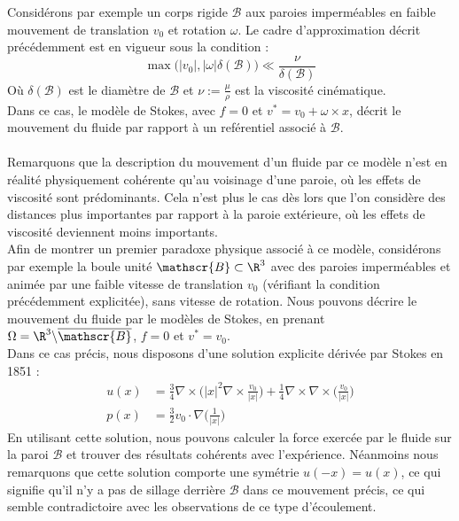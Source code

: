 Considérons par exemple un corps rigide $\mathscr{B}$ aux paroies imperméables en faible mouvement de translation $v_0$ et rotation $\omega$.
Le cadre d'approximation décrit précédemment est en vigueur sous la condition \cite{Galdi} :
$$\max\Big(|v_0|,|\omega|\delta(\mathscr{B})\Big) \ll \frac{\nu}{\delta(\mathscr{B})} $$
Où $\delta(\mathscr{B})$ est le diamètre de $\mathscr{B}$ et $\nu := \frac{\mu}{\rho} $ est la viscosité cinématique. \\
Dans ce cas, le modèle de Stokes, avec $f = 0$ et $v^* = v_0 + \omega \times x$, décrit le mouvement du fluide par rapport à un reférentiel associé à $\mathscr{B}$.\\
\\
Remarquons que la description du mouvement d'un fluide par ce modèle n'est en réalité physiquement cohérente qu'au voisinage d'une paroie, où les effets de viscosité sont prédominants. Cela n'est plus le cas dès lors que l'on considère des distances plus importantes par rapport à la paroie extérieure, où les effets de viscosité deviennent moins importants. \\
Afin de montrer un premier paradoxe physique associé à ce modèle, considérons par exemple la boule unité $\mathscr{B} \subset \R^3$ avec des paroies imperméables et animée par une faible vitesse de translation $v_0$ (vérifiant la condition précédemment explicitée), sans vitesse de rotation.
Nous pouvons décrire le mouvement du fluide par le modèles de Stokes, en prenant $\Omega = \R^3 \backslash \overline{\mathscr{B}}$, $f=0$ et $v^* = v_0$.\\
Dans ce cas précis, nous disposons d'une solution explicite dérivée par Stokes en 1851 :
\begin{align*}
    u(x) &= \frac{3}{4} \nabla \times \bigg( |x|^2 \nabla \times \frac{v_0}{|x|} \bigg) + \frac{1}{4} \nabla \times \nabla \times \bigg( \frac{v_0}{|x|} \bigg) \\
    p(x) &= \frac{3}{2} v_0 \cdot \nabla \bigg( \frac{1}{|x|} \bigg)
\end{align*}
En utilisant cette solution, nous pouvons calculer la force exercée par le fluide sur la paroi $\mathscr{B}$ et trouver des résultats cohérents avec l'expérience.
Néanmoins nous remarquons que cette solution comporte une symétrie $u(-x) = u(x)$, ce qui signifie qu'il n'y a pas de sillage derrière $\mathscr{B}$ dans ce mouvement précis, ce qui semble contradictoire avec les observations de ce type d'écoulement.









